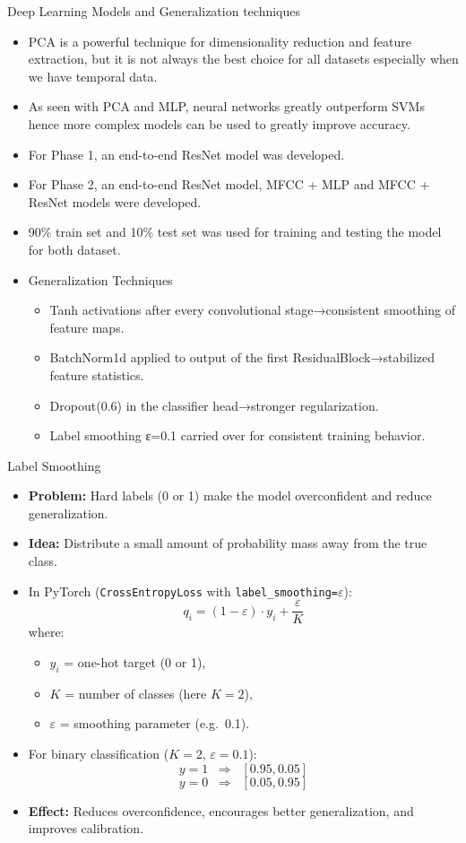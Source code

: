 \documentclass{beamer}
\begin{document}
\begin{frame}{Deep Learning Models and Generalization techniques}
  \scriptsize
  \begin{itemize}
    \item PCA is a powerful technique for dimensionality reduction and feature extraction, but it is not always the best choice for all datasets especially when we have temporal data.
    \item As seen with PCA and MLP, neural networks greatly outperform SVMs hence more complex models can be used to greatly improve accuracy.
    \item For Phase 1, an end-to-end ResNet model was developed.
    \item For Phase 2, an end-to-end ResNet model, MFCC + MLP and MFCC + ResNet models were developed.
    \item 90\% train set and 10\% test set was used for training and testing the model for both dataset.
    \item Generalization Techniques
    \scriptsize
    \begin{itemize}
      \scriptsize
      \item Tanh activations after every convolutional stage→consistent smoothing of feature maps.
      \item BatchNorm1d applied to output of the first ResidualBlock→stabilized feature statistics.
      \item Dropout(0.6) in the classifier head→stronger regularization.
      \item Label smoothing ε=0.1 carried over for consistent training behavior.
    \end{itemize}
  \end{itemize}
\end{frame}
\begin{frame}{Label Smoothing}
  \scriptsize
  \begin{itemize}
    \item \textbf{Problem:} Hard labels (0 or 1) make the model overconfident and reduce generalization.
    \item \textbf{Idea:} Distribute a small amount of probability mass away from the true class.
    \item In PyTorch (\texttt{CrossEntropyLoss} with \texttt{label\_smoothing=$\varepsilon$}):  
    \[
      q_i = (1 - \varepsilon) \cdot y_i + \frac{\varepsilon}{K}
    \]
    where:
    \begin{itemize}
      \scriptsize
      \item $y_i$ = one-hot target (0 or 1),
      \item $K$ = number of classes (here $K=2$),
      \item $\varepsilon$ = smoothing parameter (e.g.\ 0.1).
    \end{itemize}
    \item For binary classification ($K=2$, $\varepsilon = 0.1$):  
    \[
      y = 1 \;\;\Rightarrow\;\; [0.95, 0.05]
      \]
    \[
      y = 0 \;\;\Rightarrow\;\; [0.05, 0.95]
    \]
    \item \textbf{Effect:} Reduces overconfidence, encourages better generalization, and improves calibration.
  \end{itemize}
\end{frame}
\end{document}
